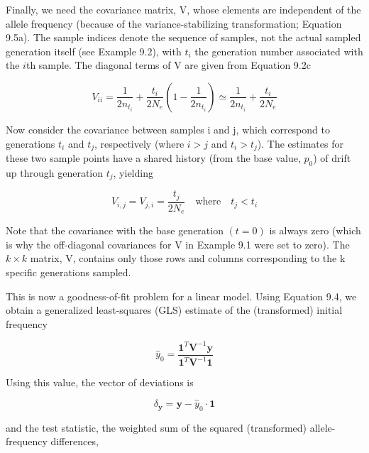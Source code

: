 \documentclass{article}
\begin{document}
Finally, we need the covariance matrix, V, whose elements are independent of the allele frequency (because of the variance-stabilizing transformation; Equation 9.5a). The sample indices denote the sequence of samples, not the actual sampled generation itself (see Example 9.2), with  $ t_i $ the generation number associated with the  $ i $th sample. The diagonal terms of V are given from Equation 9.2c

\begin{equation}
V_{ii}=\frac{1}{2n_{t_{i}}}+\frac{t_{i}}{2N_{e}}\left(1-\frac{1}{2n_{t_{i}}}\right)\simeq\frac{1}{2n_{t_{i}}}+\frac{t_{i}}{2N_{e}}
\tag{9.5c}
\label{eq:9_5c}
\end{equation}

Now consider the covariance between samples i and j, which correspond to generations  $ t_i $ and  $ t_j $, respectively (where  $ i > j $ and  $ t_i > t_j $). The estimates for these two sample points have a shared history (from the base value,  $ p_0 $) of drift up through generation  $ t_j $, yielding

\begin{equation}
V_{i,j}=V_{j,i}=\frac{t_{j}}{2N_{e}}\quad\mathrm{w h e r e}\quad t_{j}<t_{i}
\tag{9.5d}
\label{eq:9_5d}
\end{equation}

Note that the covariance with the base generation  $ (t = 0) $ is always zero (which is why the off-diagonal covariances for V in Example 9.1 were set to zero). The  $ k \times k $ matrix, V, contains only those rows and columns corresponding to the k specific generations sampled.

This is now a goodness-of-fit problem for a linear model. Using Equation 9.4, we obtain a generalized least-squares (GLS) estimate of the (transformed) initial frequency

\begin{equation}
\hat{y}_{0}=\frac{\mathbf{1}^{T}\mathbf{V}^{-1}\mathbf{y}}{\mathbf{1}^{T}\mathbf{V}^{-1}\mathbf{1}}
\tag{9.6a}
\label{eq:9_6a}
\end{equation}

Using this value, the vector of deviations is

\begin{equation}
\delta_{\mathbf{y}}=\mathbf{y}-\widehat{y}_{0}\cdot\mathbf{1}
\tag{9.6b}
\label{eq:9_6b}
\end{equation}

and the test statistic, the weighted sum of the squared (transformed) allele-frequency differences,
\end{document}
